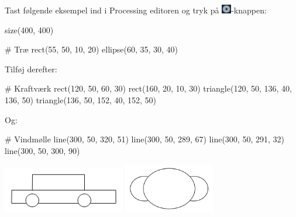 \documentclass{ucph-handout}
\begin{document}


\begin{exercisebox}[adjusted title=Første Program]
Tast følgende eksempel ind i Processing editoren og tryk på
\includegraphics[height=4mm]{illustrationer/processing_play_button}-knappen:
\begin{python}
size(400, 400)

# Træ
rect(55, 50, 10, 20)
ellipse(60, 35, 30, 40)
\end{python}
Tilføj derefter:
\begin{python}
# Kraftværk
rect(120, 50, 60, 30)
rect(160, 20, 10, 30)
triangle(120, 50, 136, 40, 136, 50)
triangle(136, 50, 152, 40, 152, 50)
\end{python}
Og:
\begin{python}
# Vindmølle
line(300, 50, 320, 51)
line(300, 50, 289, 67)
line(300, 50, 291, 32)
line(300, 50, 300, 90)
\end{python}

\includegraphics[width=0.4\textwidth]{illustrationer/bil-streg.png}
\includegraphics[width=0.3\textwidth]{illustrationer/sky.png}
\end{exercisebox}
\end{document}

